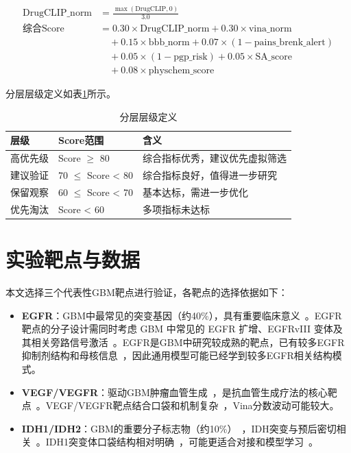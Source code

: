 \begin{equation}
\begin{aligned}
    \text{DrugCLIP\_norm} &= \frac{\max(\text{DrugCLIP}, 0)}{3.0} \\
    \text{综合Score} &= 0.30 \times \text{DrugCLIP\_norm} + 0.30 \times \text{vina\_norm} \\
                     &\quad + 0.15 \times \text{bbb\_norm} + 0.07 \times (1-\text{pains\_brenk\_alert}) \\
                     &\quad + 0.05 \times (1-\text{pgp\_risk}) + 0.05 \times \text{SA\_score} \\
                     &\quad + 0.08 \times \text{physchem\_score}
\end{aligned}
\end{equation}

分层层级定义如表\ref{tab:scoring-layers}所示。

\begin{table}[htbp]
    \centering
    \caption{分层层级定义}\label{tab:scoring-layers}
    \begin{tabular}{lll}
        \toprule
        \textbf{层级} & \textbf{Score范围} & \textbf{含义} \\
        \midrule
        高优先级 & Score $\ge$ 80 & 综合指标优秀，建议优先虚拟筛选 \\
        建议验证 & 70 $\le$ Score < 80 & 综合指标良好，值得进一步研究 \\
        保留观察 & 60 $\le$ Score < 70 & 基本达标，需进一步优化 \\
        优先淘汰 & Score < 60 & 多项指标未达标 \\
        \bottomrule
    \end{tabular}
\end{table}

\section{实验靶点与数据}\label{sec:targets}

本文选择三个代表性GBM靶点进行验证，各靶点的选择依据如下：

\begin{itemize}
    \item \textbf{EGFR}：GBM中最常见的突变基因（约40\%），具有重要临床意义~\cite{Fu2025}。EGFR靶点的分子设计需同时考虑 GBM 中常见的 EGFR 扩增、EGFRvIII 变体及其相关旁路信号激活~\cite{Fu2025}。EGFR是GBM中研究较成熟的靶点，已有较多EGFR抑制剂结构和母核信息~\cite{Fu2025}，因此通用模型可能已经学到较多EGFR相关结构模式。
    \item \textbf{VEGF/VEGFR}：驱动GBM肿瘤血管生成~\cite{Fu2025}，是抗血管生成疗法的核心靶点~\cite{Fu2025}。VEGF/VEGFR靶点结合口袋和机制复杂~\cite{Fu2025}，Vina分数波动可能较大。
    \item \textbf{IDH1/IDH2}：GBM的重要分子标志物（约10\%）~\cite{Fu2025}，IDH突变与预后密切相关~\cite{Fu2025}。IDH1突变体口袋结构相对明确~\cite{Fu2025}，可能更适合对接和模型学习~\cite{Fu2025}。
\end{itemize}

